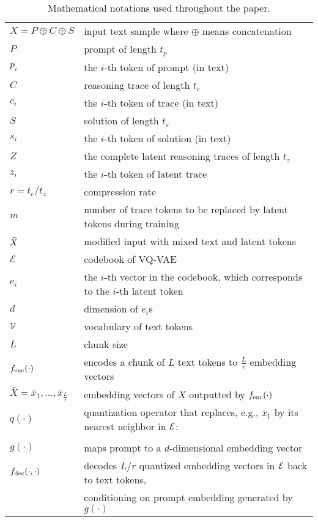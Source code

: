 \begin{table}[H]
    \centering
    \begin{tabular}{l l}
    \toprule
    $X = P \oplus C \oplus S $ & input text sample where $\oplus$ means concatenation \\
    $P$ & prompt of length $t_p$ \\
    $p_i$ & the $i$-th token of prompt (in text) \\
    $C$ & reasoning trace of length $t_c$\\
    $c_i$ & the $i$-th token of trace (in text) \\
    $S$ & solution of length $t_s$ \\
    $s_i$ & the $i$-th token of solution (in text) \\
    $Z$ & the complete latent reasoning traces of length  $t_z$ \\
    $z_i$ & the $i$-th token of latent trace\\
    $r = t_c / t_z$ & compression rate \\
    $m$ & number of trace tokens to be replaced by latent tokens during training \\
    ${\widetilde{X}} $ & modified input with mixed text and latent tokens \\
    \midrule
    $\mathcal{E}$ & codebook of VQ-VAE \\
    $e_i$ & the $i$-th vector in the codebook, which corresponds to the $i$-th latent token \\
    $d$ & dimension of $e_i$s \\
    ${\mathcal{V}}$ & vocabulary of text tokens \\
    $L$ & chunk size \\ 
    ${f_\text{enc}}(\cdot)$ &  encodes a chunk of $L$ text tokens to $\frac{L}{r}$ embedding vectors \\
    $\bar{X} = \bar{x}_1, \ldots, \bar{x}_{\frac{L}{r}} $ & embedding vectors of $X$ outputted by ${f_\text{enc}}(\cdot)$ \\
    $q(\cdot)$ & quantization operator that replaces, e.g., $\bar{x}_1$ by its nearest neighbor in ${\mathcal{E}}$: \\
        & \hskip7em $g(\bar{x}_1) = \argmin_{e_i \in \E} \norm{e_i - \bar{x}_1}^2$ \\
    $g(\cdot)$ & maps prompt to a $d$-dimensional embedding vector \\
    ${f_\text{dec}}(\cdot, \cdot)$ & decodes $L/r$ quantized embedding vectors in ${\mathcal{E}}$ back to text tokens, \\
        & conditioning on prompt embedding generated by $g(\cdot)$ \\
    \bottomrule
    \end{tabular}
    \caption{Mathematical notations used throughout the paper.}
    \label{tab:notations}
\end{table}



